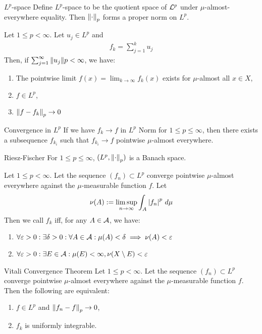 \begin{importantcorollary}{$L^p$-space}{}
	Define $L^p$-space to be the quotient space of $\mathcal{L}^p$ under $\mu$-almost-everywhere equality. Then $\norm{\cdot}_p$ forms a proper norm on $L^p$.
\end{importantcorollary}
\begin{lemma}
	Let $1 \leq p < \infty$. Let $u_j \in L^p$ and
	\begin{align*}
		f_k = \sum_{j = 1}^k u_j
	\end{align*} 
	Then, if $\sum_{j = 1}^\infty \norm{u_j}p < \infty$, we have:
	\begin{enumerate}
		\item The pointwise limit $f(x) = \lim_{k \to \infty} f_k(x)$ exists for $\mu$-almost all $x \in X$,
		\item $f \in L^p$,
		\item $\norm{f - f_k}_p \to 0$
	\end{enumerate}
\end{lemma}
\begin{importantlemma}{Convergence in $L^p$}{}
	If we have $f_k \to f$ in $L^p$ Norm for $1 \leq p \leq \infty$, then there exists a subsequence $f_{k_i}$ such that $f_{k_i} \to f$ pointwise $\mu$-almost everywhere.
\end{importantlemma}
\begin{importanttheorem}{Riesz-Fischer}{}
	For $1 \leq p \leq \infty$, $(L^p, \norm{\cdot}_p)$ is a Banach space.
\end{importanttheorem}
\begin{definition}
	Let $1 \leq p < \infty$. Let the sequence $(f_n) \subset L^p$ converge pointwise $\mu$-almost everywhere against the $\mu$-measurable function $f$. Let
	\begin{align*}
		\nu(A) := \limsup_{n \to \infty} \int_A \abs{f_n}^p ~d\mu
	\end{align*}
	Then we call $f_k$  iff, for any $A \in \mathcal{A}$, we have:
	\begin{enumerate}
		\item $\displaystyle
		\forall \varepsilon > 0 : \exists \delta > 0 : \forall A \in \mathcal{A} : \mu(A) < \delta \implies \nu(A) < \varepsilon
		$
		\item $\forall \varepsilon > 0 : \exists E \in \mathcal{A}: \mu(E) < \infty, \nu(X \setminus E) < \varepsilon$
	\end{enumerate}
\end{definition}
\begin{importanttheorem}{Vitali Convergence Theorem}{}
	Let $1 \leq p < \infty$. Let the sequence $(f_n) \subset L^p$ converge pointwise $\mu$-almost everywhere against the $\mu$-measurable function $f$. Then the following are equivalent:
	\begin{enumerate}
		\item $f \in L^p$ and $\norm{f_n - f}_p \to 0$,
		\item 
		$f_k$ is uniformly integrable.
	\end{enumerate}
\end{importanttheorem}
